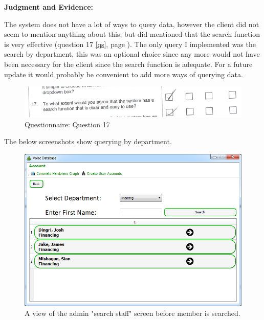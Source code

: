 \textbf{Judgment and Evidence:}

The system does not have a lot of ways to query data, however the client did not seem to mention anything about this, but did mentioned that the search function is very effective (question 17 \ref{qs}, page \pageref{qs}). The only query I implemented was the search by department, this was an optional choice since any more would not have been necessary for the client since the search function is adequate. For a future update it would probably be convenient to add more ways of querying data.

\begin{figure}[H]
    \includegraphics[width=\textwidth]{./Evaluation/EvaluationQuestionnaire/17.png}
    \caption{Questionnaire: Question 17} 
\end{figure}

The below screenshots show querying by department.

\begin{figure}[H]
    \includegraphics[width=\textwidth]{./Evaluation/Images/beforeadv.png}
    \caption{A view of the admin "search staff" screen before member is searched.} 
\end{figure}

